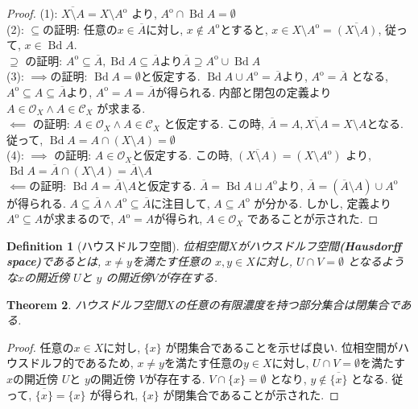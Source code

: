\documentclass[lualatex]{ltjsbook}
\newcommand{\cl}[1]{\overline{ #1}  }
\newcommand{\Int}[1]{#1 ^{\mathrm{o}} }
\newcommand{\bd}[1]{\operatorname{Bd}{#1}}
\newtheorem{theorem}{Theorem}[chapter]
\newtheorem{definition}[theorem]{Definition}
\theoremstyle{remark}
\theoremstyle{plain}
\begin{document}
\begin{proof}
	(1): $\cl{X\setminus A}= X\setminus \Int{ A }$ より,  $\Int{A} \cap \bd{A}= \emptyset$\\
	(2): $\subseteq$の証明: 任意の$x \in \cl{A}$に対し,   $x \not\in \Int{A}$とすると, $ x \in X \setminus \Int{A} = \cl{\left( X \setminus A \right) }$, 従って, $x \in \bd{A}.$\\
	$\supseteq$ の証明: $\Int{A} \subseteq \cl{A},  \bd{A} \subseteq \cl{A}$より$\cl{A} \supseteq \Int{A} \cup \bd{A}$ \\
	(3): $\implies$の証明: $\bd{A} = \emptyset$と仮定する. $\bd{A} \cup \Int{A} = \cl{A} $より,   $\Int{A} = \cl{A}$ となる,  $\Int{A} \subseteq A \subseteq \cl{A}$より,  $\Int{A} =A = \cl{A}$が得られる. 内部と閉包の定義より $A \in \mathcal{O}_X \land A \in \mathcal{C}_X$ が求まる.\\
	$\impliedby$ の証明: $A \in \mathcal{O}_X \land A \in \mathcal{C}_X$ と仮定する. この時,  $\cl{A} = A,  \cl{X\setminus A } = X \setminus A$となる.
	従って,  $\bd{A} = A \cap \left( X \setminus A \right) = \emptyset$ \\
	(4): $\implies$ の証明: $A \in \mathcal{O}_X $と仮定する. この時,  $\cl{\left( X \setminus A \right) } = \left( X \setminus \Int A \right)  $ より,  $\bd{A} = \cl{A} \cap \left( X \setminus A \right) = \cl{A} \setminus A$ \\
	$\impliedby$の証明: $\bd{A} = \cl{A} \setminus A$と仮定する. 
	$\cl{A} = \bd{A} \sqcup \Int{A}$より,  $\cl{A} = \left( \cl{A} \setminus A  \right) \cup \Int{A}$ が得られる. 
	$A \subseteq \cl{A} \land \Int{A} \subseteq \cl{A}$に注目して,   $ A \subseteq  \Int{A} $ が分かる. 
	しかし,  定義より$\Int{A} \subseteq A$が求まるので,   $\Int{A} = A$が得られ,   $A \in \mathcal{O}_X$ であることが示された.
	
\end{proof}


\begin{definition}[ハウスドルフ空間]
	位相空間$X$がハウスドルフ空間\textbf{(Hausdorff space)}であるとは,  $x\neq y$を満たす任意の $x, y \in X$に対し,   $U \cap V = \emptyset $ となるような$x$の開近傍 $U$と $y$ の開近傍$V$が存在する.
\end{definition}

\begin{theorem}
	ハウスドルフ空間$X$の任意の有限濃度を持つ部分集合は閉集合である.
\end{theorem}

\begin{proof}
	任意の$x \in X$に対し,   $\{x\} $ が閉集合であることを示せば良い.
	位相空間がハウスドルフ的であるため,  $x \neq y$を満たす任意の$y \in X$に対し,   $U \cap V =\emptyset$を満たす $x$の開近傍 $U$と $y$の開近傍 $V$が存在する.
	$V \cap \{x\} = \emptyset $ となり,  $y \not\in \cl{\{x\} } $ となる. 
	従って, $\cl{\{x\} } = \{x\}  $ が得られ,  $\{x\} $ が閉集合であることが示された.
\end{proof}
\end{document}
